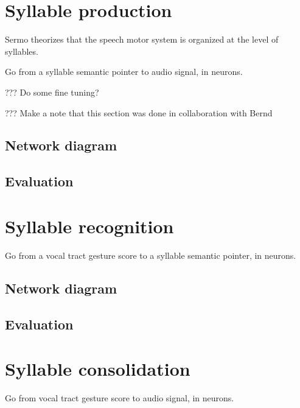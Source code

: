 \section{Syllable production}


Sermo theorizes that the speech motor system
is organized at the level of syllables.


Go from a syllable semantic pointer
to audio signal, in neurons.

??? Do some fine tuning?

??? Make a note that this section was done
in collaboration with Bernd

\subsection{Network diagram}

\subsection{Evaluation}

\section{Syllable recognition}

Go from a vocal tract gesture score
to a syllable semantic pointer, in neurons.

\subsection{Network diagram}

\subsection{Evaluation}

\section{Syllable consolidation}

Go from vocal tract gesture score
to audio signal, in neurons.


